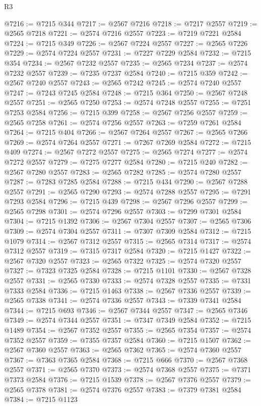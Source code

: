 \begin{lexlean}{R3}
\begin{coremodule}
@7216 := @7215 @344
@7217 := @2567 @7216
@7218 := @7217 @2557
@7219 := @2565 @7218
@7221 := @2574 @7216 @2557
@7223 := @7219 @7221 @2584
@7224 := @7215 @349
@7226 := @2567 @7224 @2557
@7227 := @2565 @7226
@7229 := @2574 @7224 @2557
@7231 := @7227 @7229 @2584
@7232 := @7215 @354
@7234 := @2567 @7232 @2557
@7235 := @2565 @7234
@7237 := @2574 @7232 @2557
@7239 := @7235 @7237 @2584
@7240 := @7215 @359
@7242 := @2567 @7240 @2557
@7243 := @2565 @7242
@7245 := @2574 @7240 @2557
@7247 := @7243 @7245 @2584
@7248 := @7215 @364
@7250 := @2567 @7248 @2557
@7251 := @2565 @7250
@7253 := @2574 @7248 @2557
@7255 := @7251 @7253 @2584
@7256 := @7215 @399
@7258 := @2567 @7256 @2557
@7259 := @2565 @7258
@7261 := @2574 @7256 @2557
@7263 := @7259 @7261 @2584
@7264 := @7215 @404
@7266 := @2567 @7264 @2557
@7267 := @2565 @7266
@7269 := @2574 @7264 @2557
@7271 := @7267 @7269 @2584
@7272 := @7215 @409
@7274 := @2567 @7272 @2557
@7275 := @2565 @7274
@7277 := @2574 @7272 @2557
@7279 := @7275 @7277 @2584
@7280 := @7215 @240
@7282 := @2567 @7280 @2557
@7283 := @2565 @7282
@7285 := @2574 @7280 @2557
@7287 := @7283 @7285 @2584
@7288 := @7215 @434
@7290 := @2567 @7288 @2557
@7291 := @2565 @7290
@7293 := @2574 @7288 @2557
@7295 := @7291 @7293 @2584
@7296 := @7215 @439
@7298 := @2567 @7296 @2557
@7299 := @2565 @7298
@7301 := @2574 @7296 @2557
@7303 := @7299 @7301 @2584
@7304 := @7215 @1392
@7306 := @2567 @7304 @2557
@7307 := @2565 @7306
@7309 := @2574 @7304 @2557
@7311 := @7307 @7309 @2584
@7312 := @7215 @1079
@7314 := @2567 @7312 @2557
@7315 := @2565 @7314
@7317 := @2574 @7312 @2557
@7319 := @7315 @7317 @2584
@7320 := @7215 @1427
@7322 := @2567 @7320 @2557
@7323 := @2565 @7322
@7325 := @2574 @7320 @2557
@7327 := @7323 @7325 @2584
@7328 := @7215 @1101
@7330 := @2567 @7328 @2557
@7331 := @2565 @7330
@7333 := @2574 @7328 @2557
@7335 := @7331 @7333 @2584
@7336 := @7215 @1463
@7338 := @2567 @7336 @2557
@7339 := @2565 @7338
@7341 := @2574 @7336 @2557
@7343 := @7339 @7341 @2584
@7344 := @7215 @693
@7346 := @2567 @7344 @2557
@7347 := @2565 @7346
@7349 := @2574 @7344 @2557
@7351 := @7347 @7349 @2584
@7352 := @7215 @1489
@7354 := @2567 @7352 @2557
@7355 := @2565 @7354
@7357 := @2574 @7352 @2557
@7359 := @7355 @7357 @2584
@7360 := @7215 @1507
@7362 := @2567 @7360 @2557
@7363 := @2565 @7362
@7365 := @2574 @7360 @2557
@7367 := @7363 @7365 @2584
@7368 := @7215 @666
@7370 := @2567 @7368 @2557
@7371 := @2565 @7370
@7373 := @2574 @7368 @2557
@7375 := @7371 @7373 @2584
@7376 := @7215 @1539
@7378 := @2567 @7376 @2557
@7379 := @2565 @7378
@7381 := @2574 @7376 @2557
@7383 := @7379 @7381 @2584
@7384 := @7215 @1123

\end{coremodule}
\end{lexlean}
